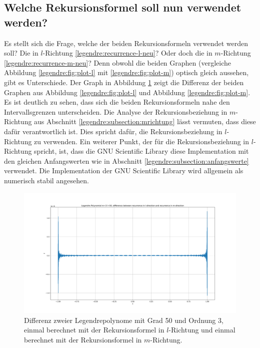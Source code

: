 \subsection{Welche Rekursionsformel soll nun verwendet werden?
\label{legendre:subsection:welche}}
Es stellt sich die Frage, welche der beiden Rekursionsformeln verwendet werden soll?
Die in $l$-Richtung \eqref{legendre:recurrence-l-neu}? Oder doch die in $m$-Richtung \eqref{legendre:recurrence-m-neu}?
Denn obwohl die beiden Graphen (vergleiche Abbildung \ref{legendre:fig:plot-l} mit \ref{legendre:fig:plot-m}) optisch gleich aussehen, gibt es Unterschiede.
Der Graph in Abbildung \ref{legendre:fig:plot-diff} zeigt die Differenz der beiden Graphen aus Abbildung \ref{legendre:fig:plot-l} und Abbildung \ref{legendre:fig:plot-m}.
Es ist deutlich zu sehen, dass sich die beiden Rekursionsformeln nahe den Intervallsgrenzen unterscheiden.
Die Analyse der Rekursionsbeziehung in $m$-Richtung aus Abschnitt \ref{legendre:subsection:mrichtung} lässt vermuten, dass diese dafür verantwortlich ist.
Dies spricht dafür, die Rekursionsbeziehung in $l$-Richtung zu verwenden.
Ein weiterer Punkt, der für die Rekursionsbeziehung in $l$-Richtung spricht, ist, dass die GNU Scientific Library \cite{legendre:gsl} diese Implementation mit den gleichen Anfangswerten wie in Abschnitt \ref{legendre:subsection:anfangswerte} verwendet.
Die Implementation der GNU Scientific Library wird allgemein als numerisch stabil angesehen.
\begin{figure}[!h]
\centering
\includegraphics[width=1.0\linewidth]{papers/legendre/plots/plot_diff_l_m}
\caption{Differenz zweier Legendrepolynome mit Grad 50 und Ordnung 3, einmal berechnet mit der Rekursionsformel in \texorpdfstring{$l$}{l}-Richtung und einmal berechnet mit der Rekursionsformel in \texorpdfstring{$m$}{m}-Richtung.}
\label{legendre:fig:plot-diff}
\end{figure}
